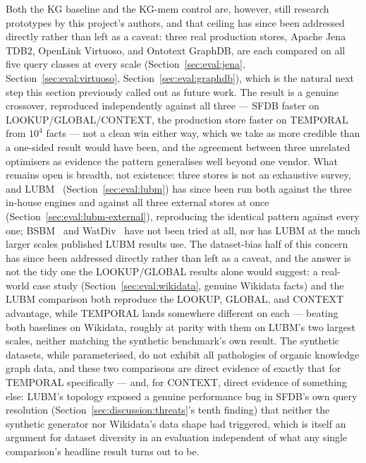 Both the KG baseline and the KG-mem control are, however, still
research prototypes by this project's authors, and that ceiling has
since been addressed directly rather than left as a caveat: three real
production stores, Apache Jena TDB2, OpenLink Virtuoso, and Ontotext
GraphDB, are each
compared on all five query classes at every
scale (Section~\ref{sec:eval:jena}, Section~\ref{sec:eval:virtuoso},
Section~\ref{sec:eval:graphdb}),
which is the natural next step this
section previously called out as future work. The result is a genuine
crossover, reproduced independently against all three --- SFDB faster on
LOOKUP/GLOBAL/CONTEXT, the production store faster on
TEMPORAL from $10^4$ facts --- not a clean win either way, which
we take as more credible than a one-sided result would have been, and
the agreement between three unrelated optimisers as evidence the pattern
generalises well beyond one vendor. What
remains open is breadth, not existence: three stores is not an
exhaustive survey, and LUBM~\cite{guo2005lubm} (Section~\ref{sec:eval:lubm}) has
since been run both against the three in-house engines and against all
three external stores at once (Section~\ref{sec:eval:lubm-external}),
reproducing the identical pattern against every one; BSBM~\cite{bizer2009bsbm} and
WatDiv~\cite{aluc2014watdiv} have not been tried at all, nor has LUBM at
the much larger scales published LUBM results use.
The dataset-bias half of this concern has since been addressed
directly rather than left as a caveat, and the answer is not the tidy
one the LOOKUP/GLOBAL results alone would suggest: a real-world case
study (Section~\ref{sec:eval:wikidata}, \wikidatanumfacts{} genuine
Wikidata facts) and the LUBM comparison both
reproduce the LOOKUP, GLOBAL, and CONTEXT advantage, while TEMPORAL
lands somewhere different on each --- beating both baselines on
Wikidata, roughly at parity with them on LUBM's two largest scales,
neither matching the synthetic benchmark's own result. The synthetic datasets, while
parameterised, do not exhibit all pathologies of organic knowledge
graph data, and these two comparisons are direct evidence of exactly
that for TEMPORAL specifically --- and, for CONTEXT, direct evidence of
something else: LUBM's topology exposed a genuine performance bug in
SFDB's own query resolution (Section~\ref{sec:discussion:threats}'s
tenth finding) that neither the synthetic generator nor Wikidata's data
shape had triggered, which is itself an argument for dataset diversity
in an evaluation independent of what any single comparison's headline
result turns out to be.

